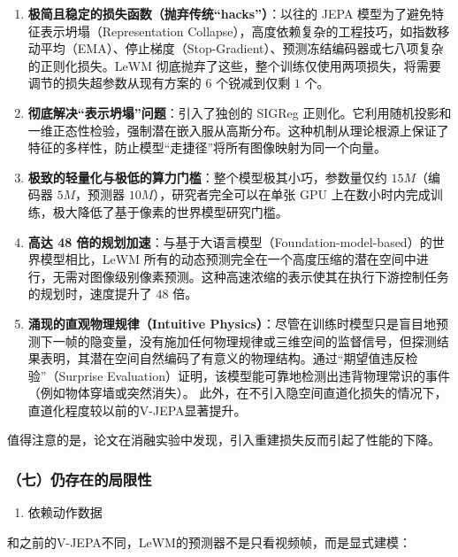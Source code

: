 \begin{enumerate}
\def\labelenumi{\arabic{enumi}.}
\tightlist
\item
  \textbf{极简且稳定的损失函数（抛弃传统``hacks''）}：以往的 JEPA 模型为了避免特征表示坍塌（Representation Collapse），高度依赖复杂的工程技巧，如指数移动平均（EMA）、停止梯度（Stop-Gradient）、预测冻结编码器或七八项复杂的正则化损失。LeWM 彻底抛弃了这些，整个训练仅使用两项损失，将需要调节的损失超参数从现有方案的 \(6\) 个锐减到仅剩 \(1\) 个。
\item
  \textbf{彻底解决``表示坍塌''问题}：引入了独创的 SIGReg 正则化。它利用随机投影和一维正态性检验，强制潜在嵌入服从高斯分布。这种机制从理论根源上保证了特征的多样性，防止模型``走捷径''将所有图像映射为同一个向量。
\item
  \textbf{极致的轻量化与极低的算力门槛}：整个模型极其小巧，参数量仅约 \(15M\)（编码器 \(5M\)，预测器 \(10M\)），研究者完全可以在单张 GPU 上在数小时内完成训练，极大降低了基于像素的世界模型研究门槛。
\item
  \textbf{高达 48 倍的规划加速}：与基于大语言模型（Foundation-model-based）的世界模型相比，LeWM 所有的动态预测完全在一个高度压缩的潜在空间中进行，无需对图像级别像素预测。这种高速浓缩的表示使其在执行下游控制任务的规划时，速度提升了 \(48\) 倍。
\item
  \textbf{涌现的直观物理规律（Intuitive Physics）}：尽管在训练时模型只是盲目地预测下一帧的隐变量，没有施加任何物理规律或三维空间的监督信号，但探测结果表明，其潜在空间自然编码了有意义的物理结构。通过``期望值违反检验''（Surprise Evaluation）证明，该模型能可靠地检测出违背物理常识的事件（例如物体穿墙或突然消失）。
  此外，在不引入隐空间直道化损失的情况下，直道化程度较以前的V-JEPA显著提升。
\end{enumerate}

值得注意的是，论文在消融实验中发现，引入重建损失反而引起了性能的下降。

\hypertarget{ux4e03ux4ecdux5b58ux5728ux7684ux5c40ux9650ux6027}{%
\subsubsection{（七）仍存在的局限性}\label{ux4e03ux4ecdux5b58ux5728ux7684ux5c40ux9650ux6027}}

\begin{enumerate}
\def\labelenumi{\arabic{enumi}.}
\tightlist
\item
  依赖动作数据
\end{enumerate}

和之前的V-JEPA不同，LeWM的预测器不是只看视频帧，而是显式建模：

